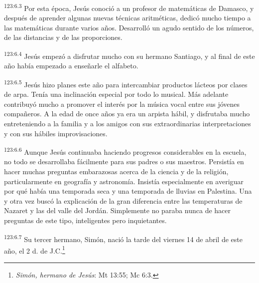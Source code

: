 \par 
\textsuperscript{123:6.3} Por esta época, Jesús conoció a un profesor de matemáticas de Damasco, y después de aprender algunas nuevas técnicas aritméticas, dedicó mucho tiempo a las matemáticas durante varios años. Desarrolló un agudo sentido de los números, de las distancias y de las proporciones.

\par 
\textsuperscript{123:6.4} Jesús empezó a disfrutar mucho con su hermano Santiago, y al final de este año había empezado a enseñarle el alfabeto.

\par 
\textsuperscript{123:6.5} Jesús hizo planes este año para intercambiar productos lácteos por clases de arpa. Tenía una inclinación especial por todo lo musical. Más adelante contribuyó mucho a promover el interés por la música vocal entre sus jóvenes compañeros. A la edad de once años ya era un arpista hábil, y disfrutaba mucho entreteniendo a la familia y a los amigos con sus extraordinarias interpretaciones y con sus hábiles improvisaciones.

\par 
\textsuperscript{123:6.6} Aunque Jesús continuaba haciendo progresos considerables en la escuela, no todo se desarrollaba fácilmente para sus padres o sus maestros. Persistía en hacer muchas preguntas embarazosas acerca de la ciencia y de la religión, particularmente en geografía y astronomía. Insistía especialmente en averiguar por qué había una temporada seca y una temporada de lluvias en Palestina. Una y otra vez buscó la explicación de la gran diferencia entre las temperaturas de Nazaret y las del valle del Jordán. Simplemente no paraba nunca de hacer preguntas de este tipo, inteligentes pero inquietantes.

\par 
\textsuperscript{123:6.7} Su tercer hermano, Simón, nació la tarde del viernes 14 de abril de este año, el 2 d. de J.C.\footnote{\textit{Simón, hermano de Jesús}: Mt 13:55; Mc 6:3.}

